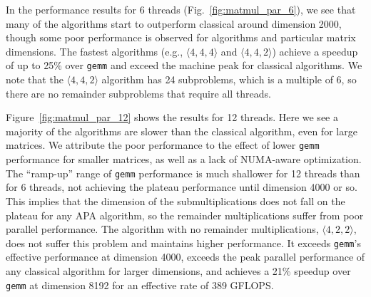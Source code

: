 \documentclass[manuscript]{acmart}
\newcommand{\dims}[1]{\langle #1 \rangle}
\begin{document}
In the performance results for 6 threads (Fig.~\ref{fig:matmul_par_6}), we see that many of the algorithms start to outperform classical around dimension 2000, though some poor performance is observed for algorithms and particular matrix dimensions.
The fastest algorithms (e.g., $\dims{4,4,4}$ and $\dims{4,4,2}$) achieve a speedup of up to 25\% over \texttt{gemm} and exceed the machine peak for classical algorithms.
We note that the $\dims{4,4,2}$ algorithm has 24 subproblems, which is a multiple of 6, so there are no remainder subproblems that require all threads.

Figure~\ref{fig:matmul_par_12} shows the results for 12 threads.
Here we see a majority of the algorithms are slower than the classical algorithm, even for large matrices.
We attribute the poor performance to the effect of lower \texttt{gemm} performance for smaller matrices, as well as a lack of NUMA-aware optimization.
The ``ramp-up'' range of \texttt{gemm} performance is much shallower for 12 threads than for 6 threads, not achieving the plateau performance until dimension 4000 or so.
This implies that the dimension of the submultiplications does not fall on the plateau for any APA algorithm, so the remainder multiplications suffer from poor parallel performance.
The algorithm with no remainder multiplications, $\dims{4,2,2}$, does not suffer this problem and maintains higher performance.
It exceeds \texttt{gemm}'s effective performance at dimension 4000, exceeds the peak parallel performance of any classical algorithm for larger dimensions, and achieves a 21\% speedup over \texttt{gemm} at dimension 8192 for an effective rate of 389 GFLOPS.
\end{document}
